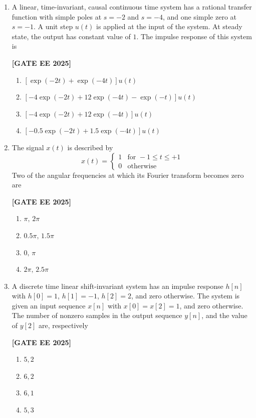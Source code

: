 \documentclass[12pt]{article}
\begin{document}
\begin{enumerate}[leftmargin=*, label=\textbf{Q.\arabic*:}]
\item A linear, time-invariant, causal continuous time system has a rational transfer function with simple poles at $s=-2$ and $s= -4$, and one simple zero at $s=-1$. A unit step $u(t)$ is applied at the input of the system. At steady state, the output has constant value of $1$. The impulse response of this system is
 
\noindent \textbf{[GATE EE 2025]}
\begin{enumerate}
    \item $\left[\exp(-2t)+\exp(-4t) \right]u(t)$
    \item $\left[ -4\exp(-2t) + 12\exp(-4t) -\exp(-t) \right]u(t)$
    \item $\left[ -4\exp(-2t) + 12\exp(-4t) \right]u(t)$
    \item $\left[ -0.5\exp(-2t) + 1.5\exp(-4t) \right]u(t)$
\end{enumerate}

\item The signal $x(t)$ is described by
\[
x(t) = \begin{cases}
1 & \text{for } -1 \leq t \leq +1 \\
0 & \text{otherwise}
\end{cases}
\]
Two of the angular frequencies at which its Fourier transform becomes zero are
 
\noindent \textbf{[GATE EE 2025]}
\begin{enumerate}
    \item $\pi,\,2\pi$
    \item $0.5\pi,\,1.5\pi$
    \item $0,\,\pi$
    \item $2\pi,\,2.5\pi$
\end{enumerate}

\item A discrete time linear shift-invariant system has an impulse response $h[n]$ with $h[0]=1$, $h[1]=-1$, $h[2]=2$, and zero otherwise. The system is given an input sequence $x[n]$ with $x[0]=x[2]=1$, and zero otherwise. The number of nonzero samples in the output sequence $y[n]$, and the value of $y[2]$ are, respectively
 
\noindent \textbf{[GATE EE 2025]}
\begin{enumerate}
    \item $5, 2$
    \item $6, 2$
    \item $6, 1$
    \item $5, 3$
\end{enumerate}


\end{enumerate}
\end{document}
